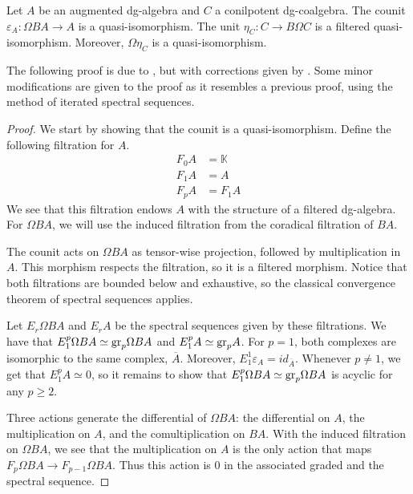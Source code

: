 \documentclass[../thesis.tex]{subfiles}
\begin{document}
            \begin{proposition}\label{prop: unit-counit-qif}
                Let $A$ be an augmented dg-algebra and $C$ a conilpotent dg-coalgebra. The counit $\varepsilon_A: \Omega BA \rightarrow A$ is a quasi-isomorphism. The unit $\eta_C: C \rightarrow B\Omega C$ is a filtered quasi-isomorphism. Moreover, $\Omega \eta_C$ is a quasi-isomorphism.
            \end{proposition}

            The following proof is due to \cite{LefevreHasegawa03}, but with corrections given by \cite{Keller05}. Some minor modifications are given to the proof as it resembles a previous proof, using the method of iterated spectral sequences.

            \begin{proof}
               We start by showing that the counit is a quasi-isomorphism. Define the following filtration for $A$.
                \begin{align*}
                    F_0A & = \mathbb{K} \\
                    F_1A & = A \\
                    F_pA & = F_1A 
                \end{align*}
                We see that this filtration endows $A$ with the structure of a filtered dg-algebra. For $\Omega BA$, we will use the induced filtration from the coradical filtration of $BA$.

                The counit acts on $\Omega BA$ as tensor-wise projection, followed by multiplication in $A$. This morphism respects the filtration, so it is a filtered morphism. Notice that both filtrations are bounded below and exhaustive, so the classical convergence theorem of spectral sequences applies.

                Let $E_r\Omega BA$ and $E_rA$ be the spectral sequences given by these filtrations. We have that $E_1^{p}\Omega BA \simeq \tt{gr}_p \Omega BA$ and $E_1^{p}A \simeq \tt{gr}_pA$. For $p=1$, both complexes are isomorphic to the same complex, $\overline{A}$. Moreover, $E_1^{1}\varepsilon_A = id_{\overline{A}}$. Whenever $p\neq 1$, we get that $E_1^p A \simeq 0$, so it remains to show that $E_1^p \Omega BA \simeq \tt{gr}_p \Omega BA$ is acyclic for any $p \geq 2$.

                Three actions generate the differential of $\Omega BA$: the differential on $A$, the multiplication on $A$, and the comultiplication on $BA$. With the induced filtration on $\Omega BA$, we see that the multiplication on $A$ is the only action that maps $F_p\Omega BA \rightarrow F_{p-1}\Omega BA$. Thus this action is $0$ in the associated graded and the spectral sequence. 


\end{proof}
\end{document}
